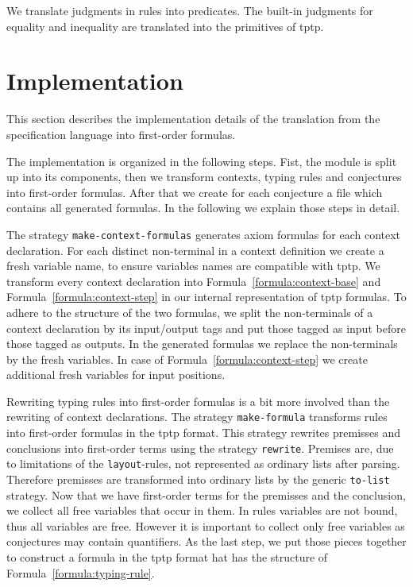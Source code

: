 We translate judgments in rules into predicates. The built-in
judgments for equality and inequality are translated into the
primitives of \gls{tptp}.
\section{Implementation}
\label{sec:implementation-fof}
This section describes the implementation details of the translation
from the specification language into first-order formulas.


The implementation is organized in the following steps. Fist, the
module is split up into its components, then we transform contexts,
typing rules and conjectures into first-order formulas. After that we
create for each conjecture a file which contains all generated
formulas. In the following we explain those steps in detail.

The strategy \verb|make-context-formulas| generates axiom formulas for
each context declaration. For each distinct non-terminal in a context
definition we create a fresh variable name, to ensure variables names
are compatible with \gls{tptp}. We transform every context declaration
into Formula~\ref{formula:context-base} and
Formula~\ref{formula:context-step} in our internal representation of
\gls{tptp} formulas. To adhere to the structure of the two formulas,
we split the non-terminals of a context declaration by its
input/output tags and put those tagged as input before those tagged as
outputs. In the generated formulas we replace the non-terminals by the
fresh variables. In case of Formula~\ref{formula:context-step} we
create additional fresh variables for input positions.

Rewriting typing rules into first-order formulas is a bit more
involved than the rewriting of context declarations. The strategy
\verb|make-formula| transforms rules into first-order formulas in the
\gls{tptp} format. This strategy rewrites premisses and conclusions
into first-order terms using the strategy \verb|rewrite|. Premises
are, due to limitations of the \texttt{layout}-rules, not represented
as ordinary lists after parsing. Therefore premisses are transformed
into ordinary lists by the generic \texttt{to-list} strategy. Now that
we have first-order terms for the premisses and the conclusion, we
collect all free variables that occur in them. In rules variables are
not bound, thus all variables are free. However it is important to
collect only free variables as conjectures may contain quantifiers. As
the last step, we put those pieces together to construct a formula in
the \gls{tptp} format hat has the structure of
Formula~\ref{formula:typing-rule}.

